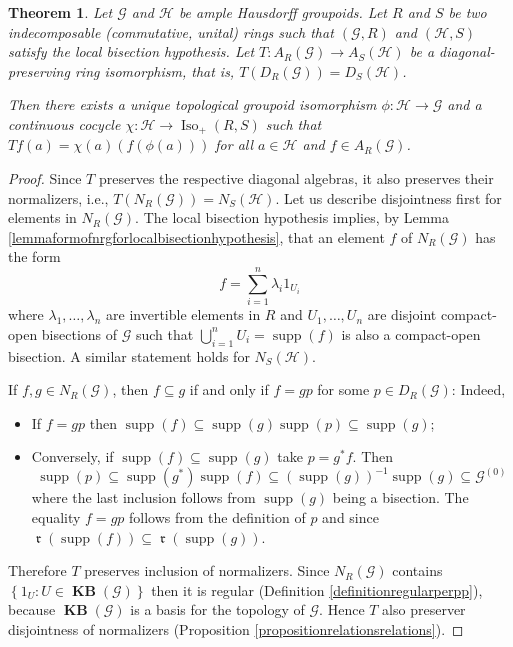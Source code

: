 \documentclass[letter,11pt]{amsart}
\theoremstyle{plain}		\newtheorem{theorem}[generalnumbering]{Theorem}
\theoremstyle{plain}		\newtheorem{corollary}[generalnumbering]{Corollary}
\theoremstyle{definition}		\newtheorem{definition}[generalnumbering]{Definition}
\theoremstyle{definition}		\newtheorem{example}[generalnumbering]{Example}
\theoremstyle{plain}		\newtheorem{proposition}[generalnumbering]{Proposition}
\theoremstyle{plain}		\newtheorem{lemma}[generalnumbering]{Lemma}
\theoremstyle{plain}    \newtheorem{plainstyle}[generalnumbering]{\namefordifferentenvironment}
\theoremstyle{plain}    \newtheorem*{plainstyle*}{\namefordifferentenvironment}
\theoremstyle{definition}    \newtheorem{definitionstyle}[generalnumbering]{\namefordifferentenvironment}
\theoremstyle{definition}    \newtheorem*{definitionstyle*}{\namefordifferentenvironment}
\DeclareMathOperator{\supp}{supp}
\DeclareMathOperator{\ra}{\mathfrak{r}}
\DeclareMathOperator{\KB}{\mathbf{KB}}
\begin{document}
\begin{theorem}\label{theoremsteinbergalgebras}
	Let $\mathcal{G}$ and $\mathcal{H}$ be ample Hausdorff groupoids. Let $R$ and $S$ be two indecomposable (commutative, unital) rings such that $(\mathcal{G},R)$ and $(\mathcal{H},S)$ satisfy the local bisection hypothesis. Let $T\colon A_R(\mathcal{G})\to A_S(\mathcal{H})$ be a diagonal-preserving ring isomorphism, that is, $T(D_R(\mathcal{G}))=D_S(\mathcal{H})$.
	
	Then there exists a unique topological groupoid isomorphism $\phi\colon\mathcal{H}\to\mathcal{G}$ and a continuous cocycle $\chi\colon\mathcal{H}\to\operatorname{Iso}_+(R,S)$ such that $Tf(a)=\chi(a)(f(\phi(a)))$ for all $a\in\mathcal{H}$ and $f\in A_R(\mathcal{G})$.
\end{theorem}
\begin{proof}
	Since $T$ preserves the respective diagonal algebras, it also preserves their normalizers, i.e., $T(N_R(\mathcal{G}))=N_S(\mathcal{H})$. Let us describe disjointness first for elements in $N_R(\mathcal{G})$. The local bisection hypothesis implies, by Lemma \ref{lemmaformofnrgforlocalbisectionhypothesis}, that an element $f$ of $N_R(\mathcal{G})$ has the form
	\[f=\sum_{i=1}^n\lambda_i1_{U_i}\]
	where $\lambda_1,\ldots,\lambda_n$ are invertible elements in $R$ and $U_1,\ldots,U_n$ are disjoint compact-open bisections of $\mathcal{G}$ such that $\bigcup_{i=1}^n U_i=\supp(f)$ is also a compact-open bisection. A similar statement holds for $N_S(\mathcal{H})$.
	
	If $f,g\in N_R(\mathcal{G})$, then $f\subseteq g$ if and only if $f=g p$ for some $p\in D_R(\mathcal{G})$: Indeed,
	\begin{itemize}
		\item If $f=gp$ then $\supp(f)\subseteq\supp(g)\supp(p)\subseteq\supp(g)$;
		\item Conversely, if $\supp(f)\subseteq\supp(g)$ take $p=g^*f$. Then
		\[\supp(p)\subseteq\supp(g^*)\supp(f)\subseteq(\supp(g))^{-1}\supp(g)\subseteq\mathcal{G}^{(0)}\]
		where the last inclusion follows from $\supp(g)$ being a bisection. The equality $f=gp$ follows from the definition of $p$ and since $\ra(\supp(f))\subseteq\ra(\supp(g))$.
	\end{itemize}
	
	Therefore $T$ preserves inclusion of normalizers. Since $N_R(\mathcal{G})$ contains $\left\{1_U:U\in\KB(\mathcal{G})\right\}$ then it is regular (Definition \ref{definitionregularperpp}), because $\KB(\mathcal{G})$ is a basis for the topology of $\mathcal{G}$. Hence $T$ also preserver disjointness of normalizers (Proposition \ref{propositionrelationsrelations}).
	

\end{proof}
\end{document}
